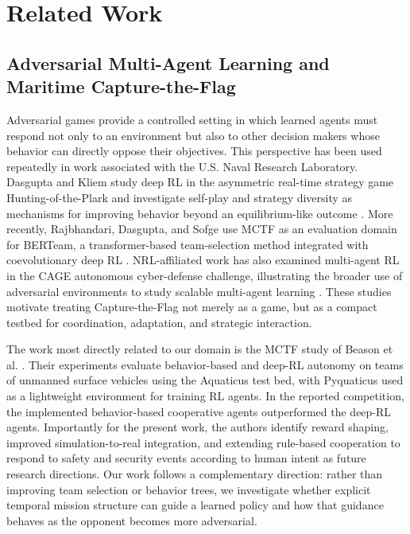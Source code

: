 \documentclass[letterpaper]{article}
\begin{document}
\section{Related Work}

\subsection{Adversarial Multi-Agent Learning and Maritime Capture-the-Flag}

Adversarial games provide a controlled setting in which learned agents must respond not only to an environment but also to other decision makers whose behavior can directly oppose their objectives. This perspective has been used repeatedly in work associated with the U.S. Naval Research Laboratory. Dasgupta and Kliem study deep RL in the asymmetric real-time strategy game Hunting-of-the-Plark and investigate self-play and strategy diversity as mechanisms for improving behavior beyond an equilibrium-like outcome \cite{dasgupta2023strategy}. More recently, Rajbhandari, Dasgupta, and Sofge use MCTF as an evaluation domain for BERTeam, a transformer-based team-selection method integrated with coevolutionary deep RL \cite{rajbhandari2025transformer}. NRL-affiliated work has also examined multi-agent RL in the CAGE autonomous cyber-defense challenge, illustrating the broader use of adversarial environments to study scalable multi-agent learning \cite{kiely2025cage}. These studies motivate treating Capture-the-Flag not merely as a game, but as a compact testbed for coordination, adaptation, and strategic interaction.

The work most directly related to our domain is the MCTF study of Beason et al. \cite{beason2024mctf}. Their experiments evaluate behavior-based and deep-RL autonomy on teams of unmanned surface vehicles using the Aquaticus test bed, with Pyquaticus used as a lightweight environment for training RL agents. In the reported competition, the implemented behavior-based cooperative agents outperformed the deep-RL agents. Importantly for the present work, the authors identify reward shaping, improved simulation-to-real integration, and extending rule-based cooperation to respond to safety and security events according to human intent as future research directions. Our work follows a complementary direction: rather than improving team selection or behavior trees, we investigate whether explicit temporal mission structure can guide a learned policy and how that guidance behaves as the opponent becomes more adversarial.
\end{document}
